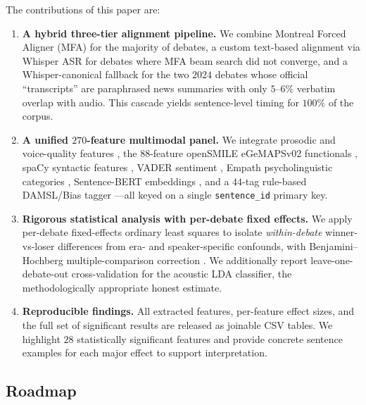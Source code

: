 \documentclass[journal]{IEEEtran}
\begin{document}
The contributions of this paper are:

\begin{enumerate}
  \item \textbf{A hybrid three-tier alignment pipeline.} We combine
        Montreal Forced Aligner (MFA) \cite{mcauliffe2017mfa} for the
        majority of debates, a custom text-based alignment via
        Whisper \cite{radford2023whisper} ASR for debates where MFA
        beam search did not converge, and a Whisper-canonical fallback
        for the two $2024$ debates whose official ``transcripts'' are
        paraphrased news summaries with only $5$--$6\%$ verbatim overlap
        with audio. This cascade yields sentence-level timing for
        $100\%$ of the corpus.
  \item \textbf{A unified $270$-feature multimodal panel.} We integrate
        prosodic and voice-quality features \cite{boersma2024praat},
        the $88$-feature openSMILE eGeMAPSv02 functionals
        \cite{eyben2016gemaps}, spaCy syntactic features
        \cite{honnibal2020spacy}, VADER sentiment \cite{hutto2014vader},
        Empath psycholinguistic categories \cite{fast2016empath},
        Sentence-BERT embeddings \cite{reimers2019sbert}, and a $44$-tag
        rule-based DAMSL/Bias tagger \cite{core1997damsl}---all keyed on
        a single \texttt{sentence\_id} primary key.
  \item \textbf{Rigorous statistical analysis with per-debate fixed
        effects.} We apply per-debate fixed-effects ordinary least
        squares to isolate \emph{within-debate} winner-vs-loser
        differences from era- and speaker-specific confounds, with
        Benjamini--Hochberg multiple-comparison correction
        \cite{benjamini1995controlling}. We additionally report
        leave-one-debate-out cross-validation for the acoustic LDA
        classifier, the methodologically appropriate honest estimate.
  \item \textbf{Reproducible findings.} All extracted features,
        per-feature effect sizes, and the full set of significant
        results are released as joinable CSV tables. We highlight $28$
        statistically significant features and provide concrete
        sentence examples for each major effect to support
        interpretation.
\end{enumerate}

\subsection{Roadmap}
\end{document}
